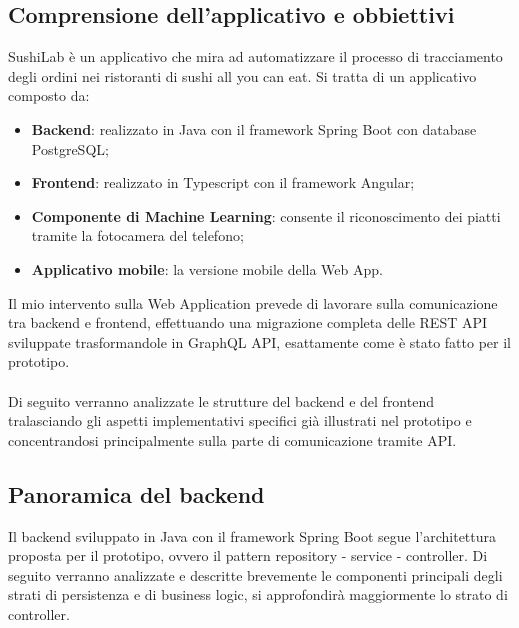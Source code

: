 \subsection{Comprensione dell'applicativo e obbiettivi}
SushiLab è un applicativo che mira ad automatizzare il processo di tracciamento degli ordini nei ristoranti di sushi all you can eat. Si tratta di un applicativo composto da:
\begin{itemize}
  \item \textbf{Backend}: realizzato in Java con il framework Spring Boot con database PostgreSQL;
  \item \textbf{Frontend}: realizzato in Typescript con il framework Angular;
  \item \textbf{Componente di Machine Learning}: consente il riconoscimento dei piatti tramite la fotocamera del telefono;
  \item \textbf{Applicativo mobile}: la versione mobile della Web App.
\end{itemize}
Il mio intervento sulla Web Application prevede di lavorare sulla comunicazione tra backend e frontend, effettuando una migrazione completa delle REST API sviluppate trasformandole in GraphQL API, esattamente come è stato fatto per il prototipo.\\\\
Di seguito verranno analizzate le strutture del backend e del frontend tralasciando gli aspetti implementativi specifici già illustrati nel prototipo e concentrandosi principalmente sulla parte di comunicazione tramite API.
\subsection{Panoramica del backend}
Il backend sviluppato in Java con il framework Spring Boot segue l'architettura proposta per il prototipo, ovvero il pattern repository - service - controller. Di seguito verranno analizzate e descritte brevemente le componenti principali degli strati di persistenza e di business logic, si approfondirà maggiormente lo strato di controller.
